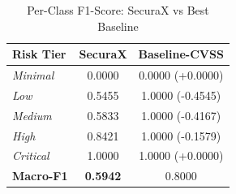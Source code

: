 \begin{table}[htbp]
\centering
\caption{Per-Class F1-Score: SecuraX vs Best Baseline}
\label{tab:per_class_f1}
\begin{tabular}{lcc}
\hline
\textbf{Risk Tier} & \textbf{SecuraX} & \textbf{Baseline-CVSS} \\
\hline
\textit{Minimal} & 0.0000 & 0.0000 (+0.0000) \\
\textit{Low} & 0.5455 & 1.0000 (-0.4545) \\
\textit{Medium} & 0.5833 & 1.0000 (-0.4167) \\
\textit{High} & 0.8421 & 1.0000 (-0.1579) \\
\textit{Critical} & 1.0000 & 1.0000 (+0.0000) \\
\hline
\textbf{Macro-F1} & \textbf{0.5942} & 0.8000 \\
\hline
\end{tabular}
\end{table}